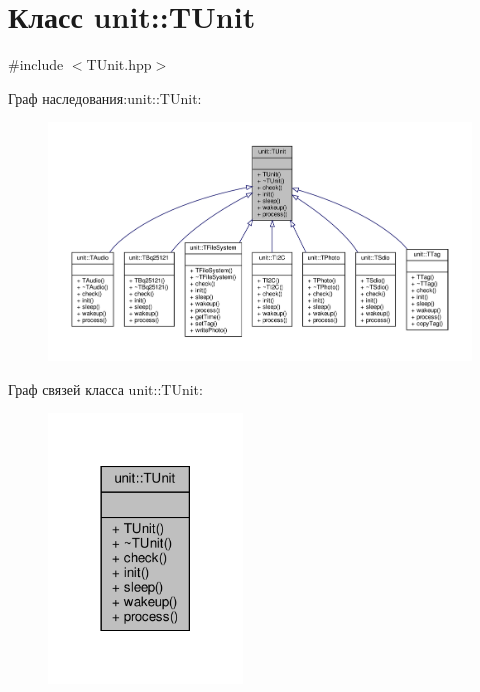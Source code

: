 \hypertarget{classunit_1_1_t_unit}{}\section{Класс unit\+:\+:T\+Unit}
\label{classunit_1_1_t_unit}


{\ttfamily \#include $<$T\+Unit.\+hpp$>$}



Граф наследования\+:unit\+:\+:T\+Unit\+:\nopagebreak
\begin{figure}[H]
\begin{center}
\leavevmode
\includegraphics[width=350pt]{classunit_1_1_t_unit__inherit__graph}
\end{center}
\end{figure}


Граф связей класса unit\+:\+:T\+Unit\+:\nopagebreak
\begin{figure}[H]
\begin{center}
\leavevmode
\includegraphics[width=146pt]{classunit_1_1_t_unit__coll__graph}
\end{center}
\end{figure}
